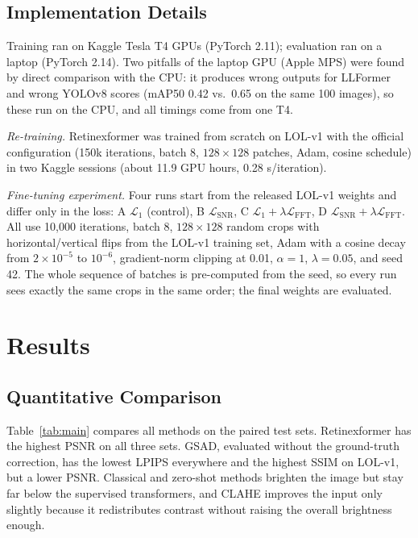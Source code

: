 \documentclass[journal]{IEEEtran}
\begin{document}
\subsection{Implementation Details}
Training ran on Kaggle Tesla T4 GPUs (PyTorch 2.11); evaluation ran on a laptop (PyTorch 2.14). Two pitfalls of the
laptop GPU (Apple MPS) were found by direct comparison with the CPU: it produces wrong outputs for LLFormer and
wrong YOLOv8 scores (mAP50 0.42 vs.\ 0.65 on the same 100 images), so these run on the CPU, and all timings come from
one T4.

\emph{Re-training.} Retinexformer was trained from scratch on LOL-v1 with the official configuration (150k iterations,
batch 8, $128\times128$ patches, Adam, cosine schedule) in two Kaggle sessions (about 11.9 GPU hours, 0.28 s/iteration).

\emph{Fine-tuning experiment.} Four runs start from the released LOL-v1 weights and differ only in the loss:
A $\mathcal{L}_1$ (control), B $\mathcal{L}_{\mathrm{SNR}}$, C $\mathcal{L}_1+\lambda\mathcal{L}_{\mathrm{FFT}}$,
D $\mathcal{L}_{\mathrm{SNR}}+\lambda\mathcal{L}_{\mathrm{FFT}}$. All use 10,000 iterations, batch 8, $128\times128$
random crops with horizontal/vertical flips from the LOL-v1 training set, Adam with a cosine decay from
$2\times10^{-5}$ to $10^{-6}$, gradient-norm clipping at 0.01, $\alpha=1$, $\lambda=0.05$, and seed 42. The whole
sequence of batches is pre-computed from the seed, so every run sees exactly the same crops in the same order; the
final weights are evaluated.

\section{Results}\label{sec:results}
\subsection{Quantitative Comparison}
Table~\ref{tab:main} compares all methods on the paired test sets. Retinexformer has the highest PSNR on all three
sets. GSAD, evaluated without the ground-truth correction, has the lowest LPIPS everywhere and the highest SSIM on
LOL-v1, but a lower PSNR. Classical and zero-shot methods brighten the image but stay far below the supervised
transformers, and CLAHE improves the input only slightly because it redistributes contrast without raising the
overall brightness enough.
\end{document}
